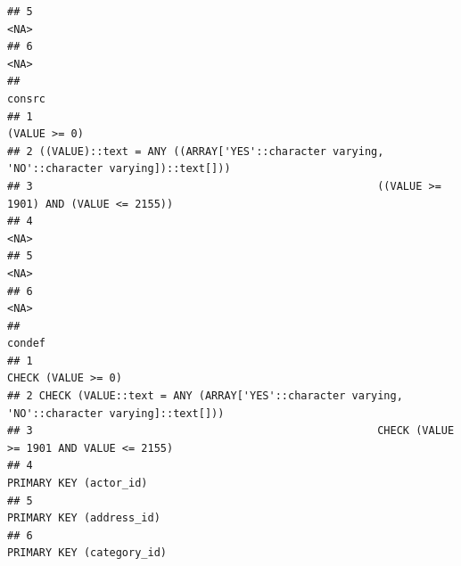 \documentclass[]{book}
\theoremstyle{definition}
\theoremstyle{definition}
\theoremstyle{definition}
\theoremstyle{remark}
\begin{document}
\begin{verbatim}
## 5                                                                                                                                                                                                                                                                                                                                                                                                                                                                                                                                                                                                                                                                                                                                                                                                                                                  <NA>
## 6                                                                                                                                                                                                                                                                                                                                                                                                                                                                                                                                                                                                                                                                                                                                                                                                                                                  <NA>
##                                                                                       consrc
## 1                                                                               (VALUE >= 0)
## 2 ((VALUE)::text = ANY ((ARRAY['YES'::character varying, 'NO'::character varying])::text[]))
## 3                                                      ((VALUE >= 1901) AND (VALUE <= 2155))
## 4                                                                                       <NA>
## 5                                                                                       <NA>
## 6                                                                                       <NA>
##                                                                                         condef
## 1                                                                           CHECK (VALUE >= 0)
## 2 CHECK (VALUE::text = ANY (ARRAY['YES'::character varying, 'NO'::character varying]::text[]))
## 3                                                      CHECK (VALUE >= 1901 AND VALUE <= 2155)
## 4                                                                       PRIMARY KEY (actor_id)
## 5                                                                     PRIMARY KEY (address_id)
## 6                                                                    PRIMARY KEY (category_id)
\end{verbatim}
\end{document}
